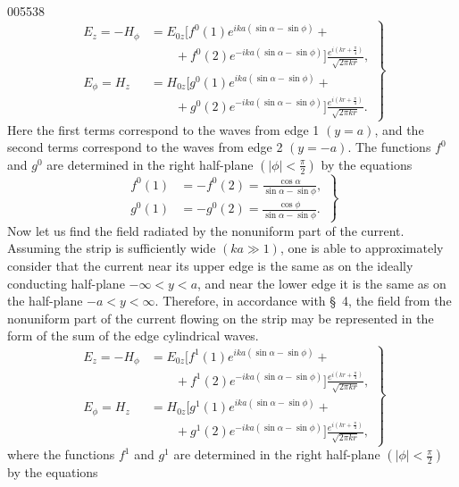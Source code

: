 \begin{scanpage}{0055}{38}
\[\left.\begin{aligned}E_z=-H_\phi&=E_{0z}[f^0(1)e^{ika(\sin\alpha-\sin\phi)}+\\&\qquad+f^0(2)e^{-ika(\sin\alpha-\sin\phi)}]\frac{e^{i(kr+\frac\pi4)}}{\sqrt{2\pi kr}},\\E_\phi=H_z&=H_{0z}[g^0(1)e^{ika(\sin\alpha-\sin\phi)}+\\&\qquad+g^0(2)e^{-ika(\sin\alpha-\sin\phi)}]\frac{e^{i(kr+\frac\pi4)}}{\sqrt{2\pi kr}}.\end{aligned}\right\}\tag{6.08}\]
Here the first terms correspond to the waves from edge 1 $(y=a)$, and the second terms correspond to the waves from edge 2 $(y=-a)$. The functions $f^0$ and $g^0$ are determined in the right half-plane $\left(|\phi|<\frac\pi2\right)$ by the equations
\[\left.\begin{aligned}f^0(1)&=-f^0(2)=\frac{\cos\alpha}{\sin\alpha-\sin\phi},\\g^0(1)&=-g^0(2)=\frac{\cos\phi}{\sin\alpha-\sin\phi}.\end{aligned}\right\}\tag{6.09}\]
Now let us find the field radiated by the nonuniform part of the current. Assuming the strip is sufficiently wide $(ka\gg1)$, one is able to approximately consider that the current near its upper edge is the same as on the ideally conducting half-plane $-\infty<y<a$, and near the lower edge it is the same as on the half-plane $-a<y<\infty$. Therefore, in accordance with \S\ 4, the field from the nonuniform part of the current flowing on the strip may be represented in the form of the sum of the edge cylindrical waves.
\[\left.\begin{aligned}E_z=-H_\phi&=E_{0z}[f^1(1)e^{ika(\sin\alpha-\sin\phi)}+\\&\qquad+f^1(2)e^{-ika(\sin\alpha-\sin\phi)}]\frac{e^{i(kr+\frac\pi4)}}{\sqrt{2\pi kr}},\\E_\phi=H_z&=H_{0z}[g^1(1)e^{ika(\sin\alpha-\sin\phi)}+\\&\qquad+g^1(2)e^{-ika(\sin\alpha-\sin\phi)}]\frac{e^{i(kr+\frac\pi4)}}{\sqrt{2\pi kr}},\end{aligned}\right\}\tag{6.10}\]
where the functions $f^1$ and $g^1$ are determined in the right half-plane $\left(|\phi|<\frac\pi2\right)$ by the equations
\end{scanpage}
